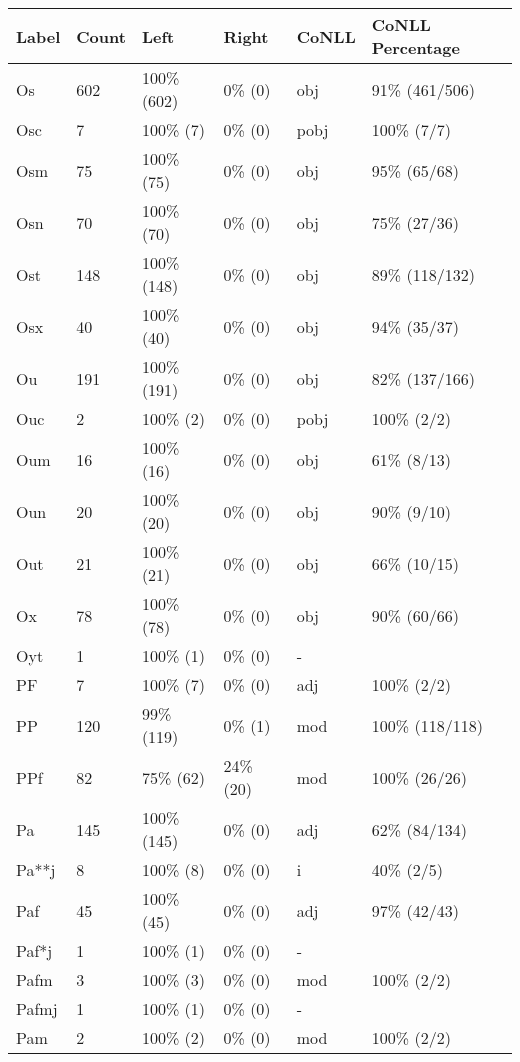 \begin{figure*}
\begin{tabular}{|l|l|l|l||l|l|}
\hline
Label & Count & Left & Right & CoNLL & CoNLL Percentage\\ 
\hline
 Os & 602 & 100\% (602) & 0\% (0) & obj & 91\% (461/506) \\ 
\hline
 Osc & 7 & 100\% (7) & 0\% (0) & pobj & 100\% (7/7) \\ 
\hline
 Osm & 75 & 100\% (75) & 0\% (0) & obj & 95\% (65/68) \\ 
\hline
 Osn & 70 & 100\% (70) & 0\% (0) & obj & 75\% (27/36) \\ 
\hline
 Ost & 148 & 100\% (148) & 0\% (0) & obj & 89\% (118/132) \\ 
\hline
 Osx & 40 & 100\% (40) & 0\% (0) & obj & 94\% (35/37) \\ 
\hline
 Ou & 191 & 100\% (191) & 0\% (0) & obj & 82\% (137/166) \\ 
\hline
 Ouc & 2 & 100\% (2) & 0\% (0) & pobj & 100\% (2/2) \\ 
\hline
 Oum & 16 & 100\% (16) & 0\% (0) & obj & 61\% (8/13) \\ 
\hline
 Oun & 20 & 100\% (20) & 0\% (0) & obj & 90\% (9/10) \\ 
\hline
 Out & 21 & 100\% (21) & 0\% (0) & obj & 66\% (10/15) \\ 
\hline
 Ox & 78 & 100\% (78) & 0\% (0) & obj & 90\% (60/66) \\ 
\hline
 Oyt & 1 & 100\% (1) & 0\% (0) & - &  \\ 
\hline
 PF & 7 & 100\% (7) & 0\% (0) & adj & 100\% (2/2) \\ 
\hline
 PP & 120 & 99\% (119) & 0\% (1) & mod & 100\% (118/118) \\ 
\hline
 PPf & 82 & 75\% (62) & 24\% (20) & mod & 100\% (26/26) \\ 
\hline
 Pa & 145 & 100\% (145) & 0\% (0) & adj & 62\% (84/134) \\ 
\hline
 Pa**j & 8 & 100\% (8) & 0\% (0) & i & 40\% (2/5) \\ 
\hline
 Paf & 45 & 100\% (45) & 0\% (0) & adj & 97\% (42/43) \\ 
\hline
 Paf*j & 1 & 100\% (1) & 0\% (0) & - &  \\ 
\hline
 Pafm & 3 & 100\% (3) & 0\% (0) & mod & 100\% (2/2) \\ 
\hline
 Pafmj & 1 & 100\% (1) & 0\% (0) & - &  \\ 
\hline
 Pam & 2 & 100\% (2) & 0\% (0) & mod & 100\% (2/2) \\ 

\end{tabular}
\end{figure*}
